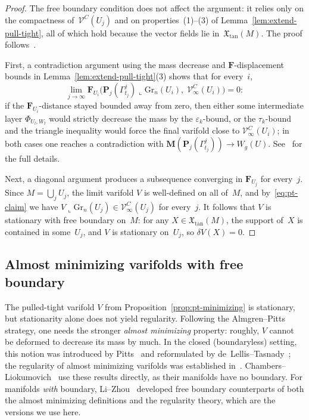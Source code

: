 \begin{proof}
The free boundary condition does not affect the argument: it relies only on the compactness of~$\mathcal{V}^C(U_j)$ and on properties~(1)--(3) of Lemma~\ref{lem:extend-pull-tight}, all of which hold because the vector fields lie in~$\mathfrak{X}_{\mathrm{tan}}(M)$. The proof follows~\cite[\S7]{CL20}.

First, a contradiction argument using the mass decrease and $\mathbf{F}$-displacement bounds in Lemma~\ref{lem:extend-pull-tight}(3) shows that for every~$i$,
\begin{equation}\label{eq:pt-claim}
\lim_{j\to\infty}\mathbf{F}_{U_i}\bigl(\mathbf{P}_j(\Gamma_{t_j}^j)\llcorner\mathrm{Gr}_n(U_i),\;\mathcal{V}^C_\infty(U_i)\bigr)=0:
\end{equation}
if the $\mathbf{F}_{U_i}$-distance stayed bounded away from zero, then either some intermediate layer $\Phi_{U_l,W_l}$ would strictly decrease the mass by the $\varepsilon_k$-bound, or the $\tau_k$-bound and the triangle inequality would force the final varifold close to $\mathcal{V}^C_\infty(U_i)$; in both cases one reaches a contradiction with $\mathbf{M}(\mathbf{P}_j(\Gamma_{t_j}^j))\to W_g(U)$. See~\cite[\S7]{CL20} for the full details.

Next, a diagonal argument produces a subsequence converging in $\mathbf{F}_{U_j}$ for every~$j$. Since $M = \bigcup_j U_j$, the limit varifold $V$ is well-defined on all of~$M$, and by~\eqref{eq:pt-claim} we have $V\llcorner\mathrm{Gr}_n(U_j)\in\mathcal{V}^C_\infty(U_j)$ for every~$j$. It follows that $V$ is stationary with free boundary on~$M$: for any $X\in\mathfrak{X}_{\mathrm{tan}}(M)$, the support of~$X$ is contained in some~$U_j$, and $V$ is stationary on~$U_j$, so $\delta V(X) = 0$.
\end{proof}

\subsection{Almost minimizing varifolds with free boundary}\label{sec:am-varifolds}

The pulled-tight varifold $V$ from Proposition~\ref{prop:pt-minimizing} is stationary, but stationarity alone does not yield regularity. Following the Almgren--Pitts strategy, one needs the stronger \emph{almost minimizing} property: roughly, $V$ cannot be deformed to decrease its mass by much. In the closed (boundaryless) setting, this notion was introduced by Pitts~\cite{Pit81} and reformulated by de~Lellis--Tasnady~\cite{DLT13}; the regularity of almost minimizing varifolds was established in~\cite{Pit81,DLT13}. Chambers--Liokumovich~\cite{CL20} use these results directly, as their manifolds have no boundary. For manifolds \emph{with} boundary, Li--Zhou~\cite[Sections~4--6]{LZ17} developed free boundary counterparts of both the almost minimizing definitions and the regularity theory, which are the versions we use here.

